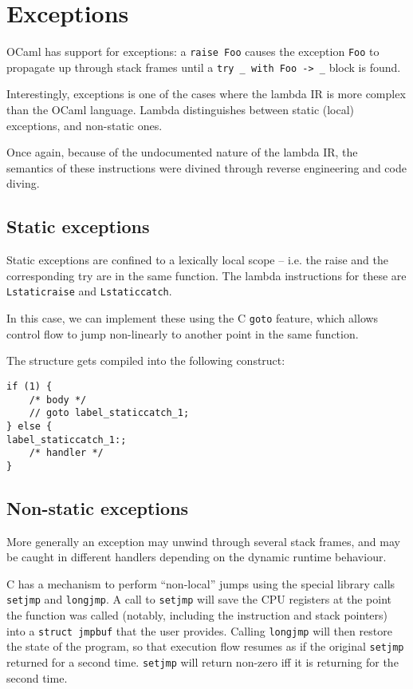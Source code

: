 \documentclass[12pt,a4paper,twoside,openright]{report}
\begin{document}
\section{Exceptions}\label{exceptions}

OCaml has support for exceptions: a \lstinline!raise Foo! causes the
exception \lstinline!Foo! to propagate up through stack frames until a
\lstinline!try _ with Foo -> _! block is found.

Interestingly, exceptions is one of the cases where the lambda IR is more
complex than the OCaml language. Lambda distinguishes between static (local)
exceptions, and non-static ones.

Once again, because of the undocumented nature of the lambda IR, the semantics
of these instructions were divined through reverse engineering and code diving.

\subsection{Static exceptions}

Static exceptions are confined to a lexically local scope -- i.e. the raise and
the corresponding try are in the same function. The lambda instructions for
these are \lstinline!Lstaticraise! and \lstinline!Lstaticcatch!.

In this case, we can implement these using the C \lstinline!goto! feature,
which allows control flow to jump non-linearly to another point in the same
function.

The structure gets compiled into the following construct:

\begin{lstlisting}
if (1) {
    /* body */
    // goto label_staticcatch_1;
} else {
label_staticcatch_1:;
    /* handler */
}
\end{lstlisting}

\subsection{Non-static exceptions}

More generally an exception may unwind through several stack frames, and may be
caught in different handlers depending on the dynamic runtime behaviour.

C has a mechanism to perform ``non-local'' jumps using the special library
calls \lstinline!setjmp! and \lstinline!longjmp!. A call to \lstinline!setjmp!
will save the CPU registers at the point the function was called (notably,
including the instruction and stack pointers) into a \lstinline!struct jmpbuf!
that the user provides. Calling \lstinline!longjmp! will then restore the state
of the program, so that execution flow resumes as if the original
\lstinline!setjmp! returned for a second time. \lstinline!setjmp! will return
non-zero iff it is returning for the second time.
\end{document}
